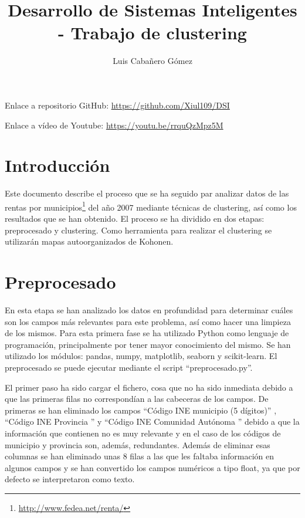 \documentclass[acmtog, screen]{acmart}
\begin{document}
\title{Desarrollo de Sistemas Inteligentes - Trabajo de clustering}

\author{Luis Cabañero Gómez}

\maketitle

Enlace a repositorio GitHub: \url{https://github.com/Xiul109/DSI}

Enlace a vídeo de Youtube: \url{https://youtu.be/rrquQzMpz5M}

\section{Introducción}
Este documento describe el proceso que se ha seguido par analizar datos de las rentas por municipios\footnote{\url{http://www.fedea.net/renta/}} del año 2007 mediante técnicas de clustering, así como los resultados que se han obtenido. El proceso se ha dividido en dos etapas: preprocesado y clustering. Como herramienta para realizar el clustering se utilizarán mapas autoorganizados de Kohonen.

\section{Preprocesado}
En esta etapa se han analizado los datos en profundidad para determinar cuáles son los campos más relevantes para este problema, así como hacer una limpieza de los mismos. Para esta primera fase se ha utilizado Python como lenguaje de programación, principalmente por tener mayor conocimiento del mismo. Se han utilizado los módulos: pandas, numpy, matplotlib, seaborn y scikit-learn. El preprocesado se puede ejecutar mediante el script ``preprocesado.py''.

El primer paso ha sido cargar el fichero, cosa que no ha sido inmediata debido a que las primeras filas no correspondían a las cabeceras de los campos. De primeras se han eliminado los campos ``Código INE municipio (5 dígitos)'' , ``Código INE Provincia '' y ``Código INE Comunidad Autónoma '' debido a que la información que contienen no es muy relevante y en el caso de los códigos de municipio y provincia son, además, redundantes. Además de eliminar esas columnas se han eliminado unas 8 filas a las que les faltaba información en algunos campos y se han convertido los campos numéricos a tipo float, ya que por defecto se interpretaron como texto.
\end{document}
